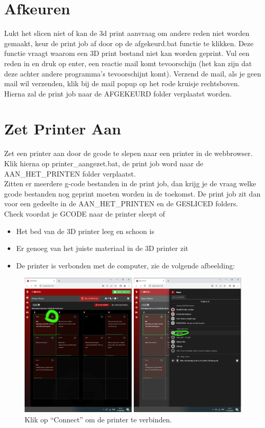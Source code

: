 \documentclass{article}
\newcommand{\quotes}[1]{``#1''}
\begin{document}
\section*{Afkeuren}
Lukt het slicen niet of kan de 3d print aanvraag om andere reden niet worden gemaakt, keur de print job af door op de afgekeurd.bat functie te klikken. Deze functie vraagt waarom een 3D print bestand niet kan worden geprint. Vul een reden in en druk op enter, een reactie mail komt tevoorschijn (het kan zijn dat deze achter andere programma's tevoorschijnt komt). Verzend de mail, als je geen mail wil verzenden, klik bij de mail popup op het rode kruisje rechtsboven. Hierna zal de print job naar de AFGEKEURD folder verplaatst worden.

\section*{Zet Printer Aan}
Zet een printer aan door de gcode te slepen naar een printer in de webbrowser. Klik hierna op printer\_aangezet.bat, de print job word naar de AAN\_HET\_PRINTEN folder verplaatst.\\

Zitten er meerdere g-code bestanden in de print job, dan krijg je de vraag welke gcode bestanden nog geprint moeten worden in de toekomst. De print job zit dan voor een gedeelte in de AAN\_HET\_PRINTEN en de GESLICED folders.\\

\noindent Check voordat je GCODE naar de printer sleept of
\begin{itemize}
  \item Het bed van de 3D printer leeg en schoon is
  \item Er genoeg van het juiste materiaal in de 3D printer zit
  \item De printer is verbonden met de computer, zie de volgende afbeelding:\\
\end{itemize}

\begin{figure}[H]
    \centering
    \includegraphics[width=1.0\textwidth]{figures/printers_overview}
    \caption*{Klik op \quotes{Connect} om de printer te verbinden.}%
\end{figure}
\end{document}
